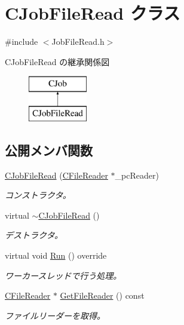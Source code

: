 \hypertarget{class_c_job_file_read}{}\section{C\+Job\+File\+Read クラス}
\label{class_c_job_file_read}


{\ttfamily \#include $<$Job\+File\+Read.\+h$>$}

C\+Job\+File\+Read の継承関係図\begin{figure}[H]
\begin{center}
\leavevmode
\includegraphics[height=2.000000cm]{class_c_job_file_read}
\end{center}
\end{figure}
\subsection*{公開メンバ関数}
\begin{DoxyCompactItemize}
\item 
\hyperlink{class_c_job_file_read_ad33f2de37cac4b1623e7173ce834323d}{C\+Job\+File\+Read} (\hyperlink{class_c_file_reader}{C\+File\+Reader} $\ast$\+\_\+pc\+Reader)
\begin{DoxyCompactList}\small\item\em コンストラクタ。 \end{DoxyCompactList}\item 
virtual \hyperlink{class_c_job_file_read_aa892176c47cc004a262d64e9a2c71f26}{$\sim$\+C\+Job\+File\+Read} ()
\begin{DoxyCompactList}\small\item\em デストラクタ。 \end{DoxyCompactList}\item 
virtual void \hyperlink{class_c_job_file_read_a0a4d39098eb64debd74d4e2edfac00b9}{Run} () override
\begin{DoxyCompactList}\small\item\em ワーカースレッドで行う処理。 \end{DoxyCompactList}\item 
\hyperlink{class_c_file_reader}{C\+File\+Reader} $\ast$ \hyperlink{class_c_job_file_read_a6c9fc153abd3d4b9888a57d3ba3727a7}{Get\+File\+Reader} () const 
\begin{DoxyCompactList}\small\item\em ファイルリーダーを取得。 \end{DoxyCompactList}\end{DoxyCompactItemize}
